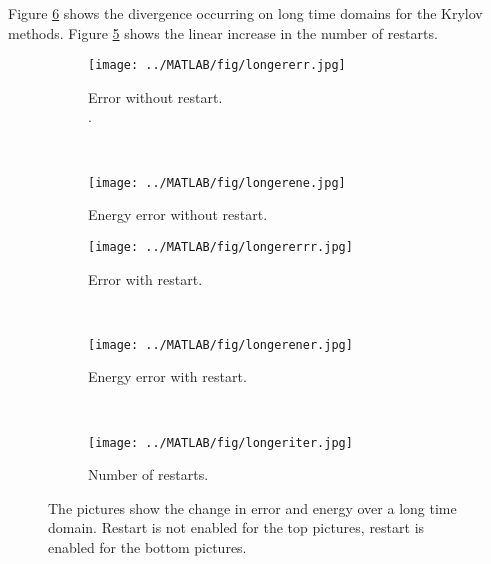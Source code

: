 \noindent Figure \ref{fig:vSLMenergyerror0} shows the divergence occurring on long time domains for the Krylov methods. Figure \ref{fig:longeriter} shows the linear increase in the number of restarts.

\begin{figure}[H]
        \centering
        \begin{subfigure}[b]{0.3\textwidth}
                \texttt{[image: ../MATLAB/fig/longererr.jpg]}
                \caption{ Error without restart.\\. }
                \label{fig:longererr}
        \end{subfigure}
        ~
        \begin{subfigure}[b]{0.3\textwidth}
                \texttt{[image: ../MATLAB/fig/longerene.jpg]}
                \caption{ Energy error without restart. }
                \label{fig:longerene}
        \end{subfigure}

        \begin{subfigure}[b]{0.3\textwidth}
                \texttt{[image: ../MATLAB/fig/longererrr.jpg]}
                \caption{ Error with restart. }
                \label{fig:longererrr}
        \end{subfigure}
        ~
        \begin{subfigure}[b]{0.3\textwidth}
                \texttt{[image: ../MATLAB/fig/longerener.jpg]}
                \caption{ Energy error with restart. }
                \label{fig:longerener}
        \end{subfigure}
     	~
        \begin{subfigure}[b]{0.3\textwidth}
                \texttt{[image: ../MATLAB/fig/longeriter.jpg]}
                \caption{ Number of restarts. }
                \label{fig:longeriter}
        \end{subfigure}        
        
        \caption{ The pictures show the change in error and energy over a long time domain. Restart is not enabled for the top pictures, restart is enabled for the bottom pictures. }
        \label{fig:vSLMenergyerror0}
\end{figure}

